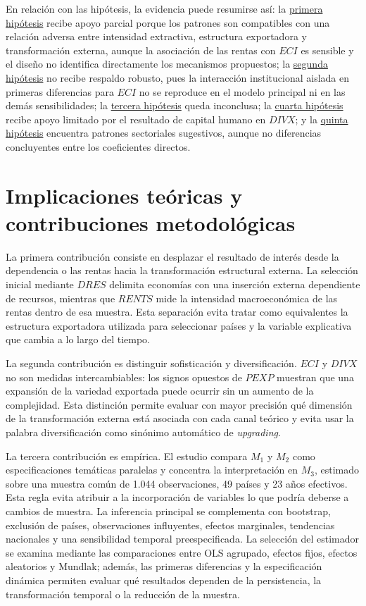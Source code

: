 \documentclass[../../TFM.tex]{subfiles}
\begin{document}
En relación con las hipótesis, la evidencia puede resumirse así: la
\hyperref[hyp:h1]{primera hipótesis} recibe apoyo parcial porque los patrones son
compatibles con una relación adversa entre intensidad extractiva, estructura
exportadora y transformación externa, aunque la asociación de las rentas con
$ECI$ es sensible y el diseño no identifica directamente los mecanismos
propuestos; la \hyperref[hyp:h2]{segunda hipótesis} no recibe respaldo robusto,
pues la interacción institucional aislada en primeras diferencias para $ECI$ no
se reproduce en el modelo principal ni en las demás sensibilidades; la
\hyperref[hyp:h3]{tercera hipótesis} queda inconclusa; la
\hyperref[hyp:h4]{cuarta hipótesis} recibe apoyo limitado por el resultado de
capital humano en $DIVX$; y la \hyperref[hyp:h5]{quinta hipótesis} encuentra
patrones sectoriales sugestivos, aunque no diferencias concluyentes entre los
coeficientes directos.


\section{Implicaciones teóricas y contribuciones metodológicas}
\label{sec:implicaciones-teoricas}

La primera contribución consiste en desplazar el resultado de interés desde la
dependencia o las rentas hacia la transformación estructural externa. La
selección inicial mediante $DRES$ delimita economías con una inserción externa
dependiente de recursos, mientras que $RENTS$ mide la intensidad macroeconómica
de las rentas dentro de esa muestra. Esta separación evita tratar como
equivalentes la estructura exportadora utilizada para seleccionar países y la
variable explicativa que cambia a lo largo del tiempo.

La segunda contribución es distinguir sofisticación y diversificación. $ECI$ y
$DIVX$ no son medidas intercambiables: los signos opuestos de $PEXP$ muestran
que una expansión de la variedad exportada puede ocurrir sin un aumento de la
complejidad. Esta distinción permite evaluar con mayor precisión qué dimensión
de la transformación externa está asociada con cada canal teórico y evita usar
la palabra diversificación como sinónimo automático de \textit{upgrading}.

La tercera contribución es empírica. El estudio compara $M_1$ y $M_2$ como
especificaciones temáticas paralelas y concentra la interpretación en $M_3$,
estimado sobre una muestra común de 1.044 observaciones, 49 países y 23 años
efectivos. Esta regla evita atribuir a la incorporación de variables lo que
podría deberse a cambios de muestra. La inferencia principal se complementa con
bootstrap, exclusión de países, observaciones influyentes, efectos marginales,
tendencias nacionales y una sensibilidad temporal preespecificada. La selección
del estimador se examina mediante las comparaciones entre OLS agrupado,
efectos fijos, efectos aleatorios y Mundlak; además, las primeras diferencias y
la especificación dinámica permiten evaluar qué resultados dependen de la
persistencia, la transformación temporal o la reducción de la muestra.
\end{document}
